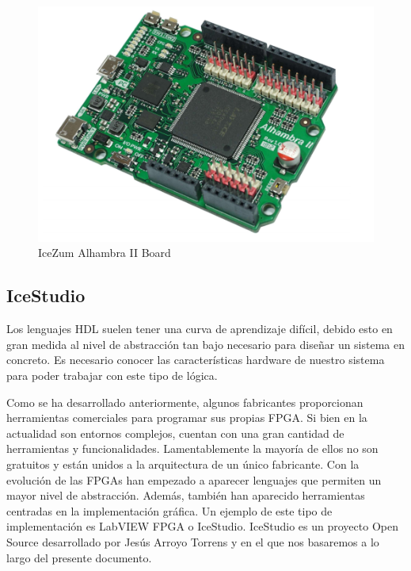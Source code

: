 \begin{center}
	\begin{figure}[H]
		\center
		\includegraphics[scale=0.5]{imagenes/EstadoArte/IceZumAlhambra.PNG}
		\caption{IceZum Alhambra II Board}
		\label{fig: IceZumAlhambraII}
	\end{figure} 
\end{center}


\subsection{IceStudio}\label{sec:IceStudio}
Los lenguajes HDL suelen tener una curva de aprendizaje difícil, debido esto en gran medida al nivel de abstracción tan bajo necesario para diseñar un sistema en concreto. Es necesario conocer las características hardware de nuestro sistema para poder trabajar con este tipo de lógica. \newline

Como se ha desarrollado anteriormente, algunos fabricantes proporcionan herramientas comerciales para programar sus propias FPGA. Si bien en la actualidad son entornos complejos, cuentan con una gran cantidad de herramientas y funcionalidades. Lamentablemente la mayoría de ellos no son gratuitos y están unidos a la arquitectura de un único fabricante.
\newline
Con la evolución de las FPGAs han empezado a aparecer lenguajes que permiten un mayor nivel de abstracción. 
Además, también han aparecido herramientas centradas en la implementación gráfica. Un ejemplo de este tipo de implementación es LabVIEW FPGA o IceStudio. \newline
IceStudio es un proyecto Open Source desarrollado por Jesús Arroyo Torrens y en el que nos basaremos a lo largo del presente documento. \newline

